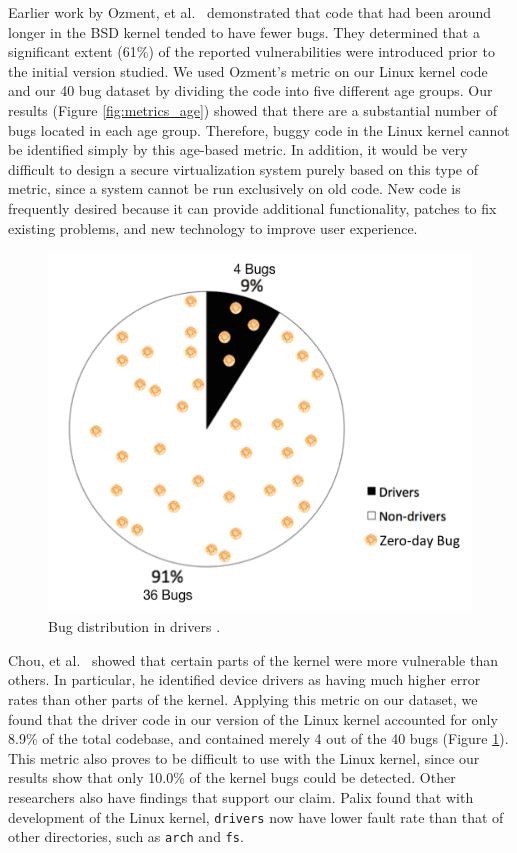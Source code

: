 Earlier work by Ozment, et al.~\cite{ozment2006milk} demonstrated that code that
had been around longer in the BSD kernel tended to have fewer bugs.
They determined that a significant extent (61\%) of the reported
vulnerabilities were
introduced prior to the initial version studied.
We used Ozment's metric on our Linux kernel code and our 40 bug dataset
by dividing the code into five different age groups.
Our results (Figure \ref{fig:metrics_age}) showed that there are a substantial
number of bugs located in each age group.
Therefore, buggy code in the Linux kernel cannot be identified simply
by this age-based metric. 
In addition, it would be very difficult to design a secure virtualization system purely based on 
this type of metric, since a system cannot be run exclusively on old code. 
New code is frequently desired because it can provide additional functionality, patches to 
fix existing problems, and new technology to improve user experience.   

\begin{figure}
\centering
\includegraphics[width=0.9\columnwidth]{diagram/metrics_drivers.png}
\caption{\small Bug distribution in drivers \cite{PittSFIeld}.}
\label{fig:metrics_drivers}
\end{figure}

Chou, et al.~\cite{PittSFIeld} showed that certain parts of the kernel
were more vulnerable than others. In particular, he identified device drivers as
having much higher error rates than other parts of the kernel.
Applying this metric on our dataset, we found that the driver code in our version
of the Linux kernel accounted for only 8.9\% of the total codebase, and contained
merely 4 out of the 40 bugs (Figure \ref{fig:metrics_drivers}).
This metric also proves to be difficult to use with the
Linux kernel, since our results show that
only 10.0\% of the kernel bugs could be detected. 
Other researchers also have findings that support our claim. 
Palix \cite{palix2011faults} found that with development of the Linux kernel, 
\texttt{drivers} now have lower 
fault rate than that of other directories, such as \texttt{arch} and \texttt{fs}. 

